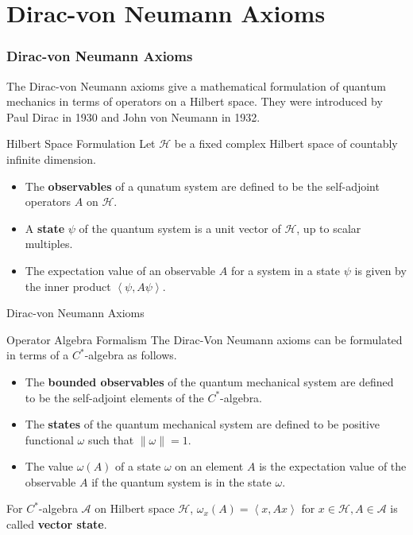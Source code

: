 \documentclass{beamer}
\begin{document}
        \section{Dirac-von Neumann Axioms}
        \begin{frame}
            \frametitle{Dirac-von Neumann Axioms}
            
            The Dirac-von Neumann axioms give a mathematical formulation of quantum mechanics in terms of operators on a Hilbert space. They were introduced by Paul Dirac in 1930 and John von Neumann in 1932.\pause
            
            \begin{block}{Hilbert Space Formulation}
            Let \(\mathcal{H}\) be a fixed complex Hilbert space of countably infinite dimension.\pause
            \begin{itemize}
                \item The \textbf{observables} of a qunatum system are defined to be the self-adjoint operators \(A\) on \(\mathcal{H}\).\pause
                \item A \textbf{state} \(\psi\) of the quantum system is a unit vector of \(\mathcal{H}\), up to scalar multiples.\pause
                \item The expectation value of an observable \(A\) for a system in a state \(\psi\) is given by the inner product \(\left \langle \psi,A\psi \right \rangle\).
            \end{itemize}
        \end{block}
    \end{frame}
    \begin{frame}{Dirac-von Neumann Axioms}
        \begin{block}{Operator Algebra Formalism}
            The Dirac-Von Neumann axioms can be formulated in terms of a \(C^\ast\)-algebra as follows.\pause
            \begin{itemize}
                \item The \textbf{bounded observables} of the quantum mechanical system are defined to be the self-adjoint elements of the \(C^\ast\)-algebra.\pause
                \item The \textbf{states} of the quantum mechanical system are defined to be positive functional \(\omega\) such that \(\left \lVert \omega \right \rVert=1\).\pause
                \item The value \(\omega(A)\) of a state \(\omega\) on an element \(A\) is the expectation value of the observable \(A\) if the quantum system is in the state \(\omega\).\pause
            \end{itemize}
        \end{block}        
        \begin{example}
            For \(C^\ast\)-algebra \(\mathcal{A}\) on Hilbert space \(\mathcal{H}\),
            \(\omega_x(A)=\left \langle x,Ax \right \rangle\) for \(x \in \mathcal{H}, A \in \mathcal{A}\) is called \textbf{vector state}.
        \end{example}
    \end{frame}
    
\end{document}
